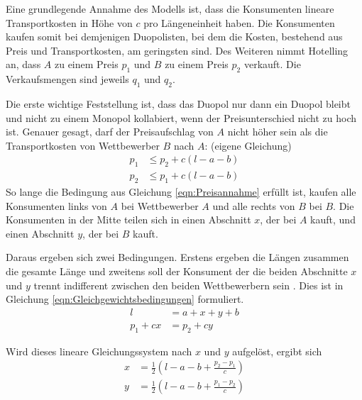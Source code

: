 Eine grundlegende Annahme des Modells ist, dass die Konsumenten lineare Transportkosten in Höhe von $c$ pro Längeneinheit haben.
Die Konsumenten kaufen somit bei demjenigen Duopolisten, bei dem die Kosten, bestehend aus Preis und Transportkosten, am geringsten sind.
Des Weiteren nimmt Hotelling an, dass $A$ zu einem Preis $p_1$ und $B$ zu einem Preis $p_2$ verkauft.
Die Verkaufsmengen sind jeweils $q_1$ und $q_2$. \citep[S.\,45]{hotelling1929}

Die erste wichtige Feststellung ist, dass das Duopol nur dann ein Duopol bleibt und nicht zu einem Monopol kollabiert, wenn der Preisunterschied nicht zu hoch ist.
Genauer gesagt, darf der Preisaufschlag von $A$ nicht höher sein als die Transportkosten von Wettbewerber $B$ nach $A$: \citep[S.\,45-46]{hotelling1929} (eigene Gleichung)
\begin{equation}\label{eqn:Preisannahme}
\begin{split}
p_1 &\leq p_2 + c(l-a-b) \\
p_2 &\leq p_1 + c(l-a-b)
\end{split}
\end{equation}
So lange die Bedingung aus Gleichung \ref{eqn:Preisannahme} erfüllt ist, kaufen alle Konsumenten links von $A$ bei Wettbewerber $A$ und alle rechts von $B$ bei $B$.
Die Konsumenten in der Mitte teilen sich in einen Abschnitt $x$, der bei $A$ kauft, und einen Abschnitt $y$, der bei $B$ kauft.

Daraus ergeben sich zwei Bedingungen. Erstens ergeben die Längen zusammen die gesamte Länge und zweitens soll der Konsument der die beiden Abschnitte $x$ und $y$ trennt indifferent zwischen den beiden Wettbewerbern sein \citep[S.\,46]{hotelling1929}. Dies ist in Gleichung \ref{eqn:Gleichgewichtsbedingungen} formuliert.
\begin{equation}\label{eqn:Gleichgewichtsbedingungen}
\begin{split}
l &= a + x + y + b \\
p_1 + cx &= p_2 + cy
\end{split}
\end{equation}

Wird dieses lineare Gleichungssystem nach $x$ und $y$ aufgelöst, ergibt sich \citep[S.\,46]{hotelling1929}
\begin{equation}
\begin{split}
x &= \tfrac{1}{2} \left(l-a-b+\frac{p_2-p_1}{c}\right)\\
y &= \tfrac{1}{2} \left(l-a-b+\frac{p_1-p_2}{c}\right)
\end{split}
\end{equation}

